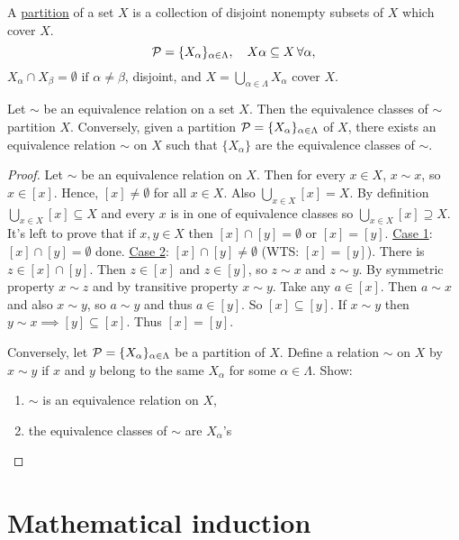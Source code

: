\documentclass[]{article}
\begin{document}
\begin{definition}
	A \ul{partition} of a set $X$ is a collection of disjoint nonempty subsets of $X$ which cover $X$.
	$$\mathcal{P} = \{X_\alpha\}_{\alpha\in \Lambda}, \quad X\alpha\subseteq X\, \forall \alpha,$$
	$X_\alpha \cap X_\beta = \emptyset \text{ if } \alpha \neq \beta$, disjoint, and $X = \bigcup_{\alpha\in\Lambda} X_\alpha$ cover $X$.
\end{definition}
\begin{theorem}
	Let $\sim $ be an equivalence relation on a set $X$. Then the equivalence classes of $\sim$ partition $X$. Conversely, given a partition $\mathcal{P} = \{X_\alpha\}_{\alpha\in\Lambda}$ of $X$, there exists an equivalence relation $\sim$ on $X$ such that $\{X_\alpha\}$ are the equivalence classes of $\sim$.
\end{theorem}
\begin{proof}
	Let $\sim$ be an equivalence relation on $X$. Then for every $x\in X$, $x\sim x$, so $x\in [x]$. Hence, $[x]\neq \emptyset$ for all $x\in X$. Also $\bigcup_{x\in X}[x] = X$. By definition $\bigcup_{x\in X}[x] \subseteq X$ and  every $x$ is in one of equivalence classes so $\bigcup_{x\in X}[x] \supseteq X$. It's left to prove that if $x,y\in X$ then $[x]\cap [y] = \emptyset$ or $[x]=[y]$.
	\ul{Case 1}: $[x]\cap[y] = \emptyset$ done. \ul{Case 2}: $[x]\cap[y]\neq \emptyset$ (WTS: $[x]=[y]$). There is $z\in[x]\cap[y]$. Then $z\in[x]$ and $z\in[y]$, so $z\sim x$ and $z\sim y$. By symmetric property $x\sim z$ and by transitive property $x\sim y$. Take any $a\in [x]$. Then $a\sim x$ and also $x\sim y$, so $a\sim y$ and thus $a\in [y]$. So $[x]\subseteq [y]$. If $x\sim y$ then $y\sim x \implies [y]\subseteq [x]$. Thus $[x]=[y]$.
	
	Conversely, let $\mathcal{P} = \{X_\alpha\}_{\alpha\in\Lambda}$ be a partition of $X$. Define a relation $\sim$ on $X$ by $x\sim y$ if $x$ and $y$ belong to the same $X_\alpha$ for some $\alpha\in\Lambda$. Show:
	\begin{enumerate}
		\item $\sim$ is an equivalence relation on $X$,
		\item the equivalence classes of $\sim$ are $X_\alpha$'s
	\end{enumerate}
\end{proof}

\section*{Mathematical induction}
\end{document}
